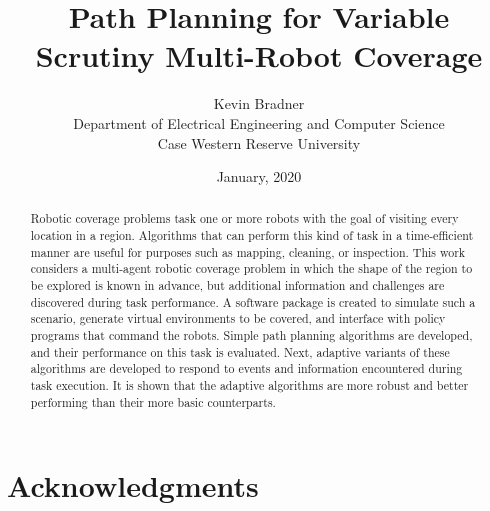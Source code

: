 \title{Path Planning for Variable Scrutiny Multi-Robot Coverage}

\author{Kevin Bradner\\Department of Electrical Engineering and Computer Science\\Case Western Reserve University}
\date{January, 2020}
\maketitle

\tableofcontents

\listoftables

\listoffigures

\section*{Acknowledgments}

\begin{abstract}
Robotic coverage problems task one or more robots with the goal of visiting every location in a region. Algorithms that can perform this kind of task in a time-efficient manner are useful for purposes such as mapping, cleaning, or inspection. This work considers a multi-agent robotic coverage problem in which the shape of the region to be explored is known in advance, but additional information and challenges are discovered during task performance. A software package is created to simulate such a scenario, generate virtual environments to be covered, and interface with policy programs that command the robots. Simple path planning algorithms are developed, and their performance on this task is evaluated. Next, adaptive variants of these algorithms are developed to respond to events and information encountered during task execution. It is shown that the adaptive algorithms are more robust and better performing than their more basic counterparts.
\end{abstract}